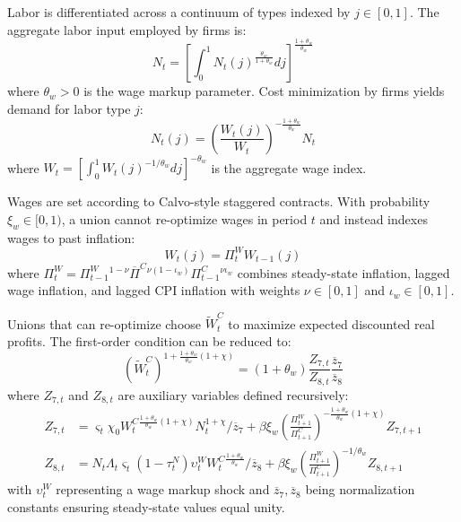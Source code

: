 \documentclass[12pt]{article}
\begin{document}
Labor is differentiated across a continuum of types indexed by $j \in [0,1]$. The aggregate labor input employed by firms is:
\begin{equation}
N_t = \left[ \int_0^1 N_t(j)^{\frac{\theta_w}{1+\theta_w}} dj \right]^{\frac{1+\theta_w}{\theta_w}}
\end{equation}
where $\theta_w > 0$ is the wage markup parameter. Cost minimization by firms yields demand for labor type $j$:
\begin{equation}
N_t(j) = \left( \frac{W_t(j)}{W_t} \right)^{-\frac{1+\theta_w}{\theta_w}} N_t
\end{equation}
where $W_t = \left[ \int_0^1 W_t(j)^{-1/\theta_w} dj \right]^{-\theta_w}$ is the aggregate wage index.

Wages are set according to Calvo-style staggered contracts. With probability $\xi_w \in [0,1)$, a union cannot re-optimize wages in period $t$ and instead indexes wages to past inflation:
\begin{equation}
W_t(j) = \Pi_t^W W_{t-1}(j)
\end{equation}
where $\Pi_t^W = \Pi_{t-1}^W {}^{1-\nu} \overline{\Pi}^C {}^{\nu(1-\iota_w)} \Pi_{t-1}^C {}^{\nu \iota_w}$ combines steady-state inflation, lagged wage inflation, and lagged CPI inflation with weights $\nu \in [0,1]$ and $\iota_w \in [0,1]$.

Unions that can re-optimize choose $\tilde{W}_t^C$ to maximize expected discounted real profits. The first-order condition can be reduced to:
\begin{equation}
(\tilde{W}_t^C)^{1 + \frac{1+\theta_w}{\theta_w}(1+\chi)} = (1+\theta_w) \frac{Z_{7,t}}{Z_{8,t}} \frac{\overline{z}_7}{\overline{z}_8}
\end{equation}
where $Z_{7,t}$ and $Z_{8,t}$ are auxiliary variables defined recursively:
\begin{align}
Z_{7,t} &= \varsigma_t \chi_0 W_t^C{}^{\frac{1+\theta_w}{\theta_w}(1+\chi)} N_t^{1+\chi} / \overline{z}_7 + \beta \xi_w \left( \frac{\Pi_{t+1}^W}{\Pi_{t+1}^C} \right)^{-\frac{1+\theta_w}{\theta_w}(1+\chi)} Z_{7,t+1} \label{eq:z7}\\
Z_{8,t} &= N_t \Lambda_t \varsigma_t (1-\tau_t^N) \upsilon_t^W W_t^C{}^{\frac{1+\theta_w}{\theta_w}} / \overline{z}_8 + \beta \xi_w \left( \frac{\Pi_{t+1}^W}{\Pi_{t+1}^C} \right)^{-1/\theta_w} Z_{8,t+1} \label{eq:z8}
\end{align}
with $\upsilon_t^W$ representing a wage markup shock and $\overline{z}_7, \overline{z}_8$ being normalization constants ensuring steady-state values equal unity.
\end{document}
